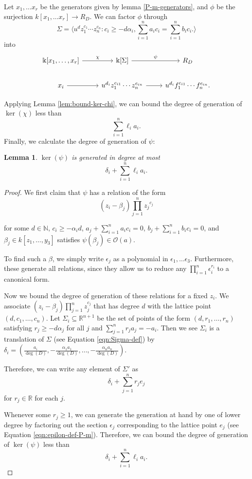 \documentclass{amsart}
\theoremstyle{plain}
\newtheorem{lem}[thm]{Lemma}
\theoremstyle{definition}
\theoremstyle{remark}
\numberwithin{equation}{section}
\newcommand\bk{{\Bbbk}}
\newcommand\bida{a}
\newcommand\bidb{b}
\begin{document}
Let $x_1, \ldots x_r$ be the generators given by lemma  \ref{P-m-generators}, and $\phi$ be the surjection $k[x_1, \ldots x_r] \to R_D$.  We can factor $\phi$ through 
\[
	\Sigma =  \langle u^d z_1^{c_1} \cdots z_n^{c_n} : c_i \geq -d \alpha_i, \sum_{i=1}^{n} \bida_i c_i = \sum_{i=1}^{n} \bidb_i c_i. \rangle 
\]
into
\[
\begin{tikzcd}
\bk[x_1,\ldots, x_r] \ar {r}{\chi} & \bk[\Sigma] \ar {r}{\psi} & R_D \\
x_i \ar r & u^{d_i}z_1^{c_{i1}} \cdots z_n^{c_{in}} \ar r & u^{d_i}f_1^{c_{i1}} \cdots f_n^{c_{in}}.
\end{tikzcd}
\]

Applying Lemma \ref{lem:bound-ker-chi}, we can bound the degree of generation of $\ker(\chi)$ less than
\[
	\sum_{i=1}^n \ell_i a_i.
\]
Finally, we calculate the degree of generation of $\psi$:

\begin{lem}\label{P-m-relations-psi}
$\ker(\psi)$ is generated in degree at most 
\[
	\delta_i + \sum_{i=1}^n \ell_i a_i.
\]
\end{lem}
\begin{proof}
We first claim that $\psi$ has a relation of the form
\begin{equation}\label{eqn:relations-psi}
	(z_i - \beta_j)\prod_{j=1}^n {z_j}^{c_{j}}
\end{equation}

\noindent
for some $d\in \mathbb{N}$, $c_i \ge -\alpha_i d$, $\bida_j + \sum_{i = 1}
^n \bida_i c_i = 0$, $\bidb_j + \sum_{i=1}^n \bidb_i c_i = 0$, and $\beta_j \in
k[z_1, \ldots, y_3]$ satisfies $\psi(\beta_j)\in \mathscr{O}(\bida)$.

To find such a $\beta$, we simply write $\epsilon_j$ as a 
polynomial in $\epsilon_1, \ldots \epsilon _3$. Furthermore, these
generate all relations, since they allow us to reduce any $\prod_{i =
1}^n \epsilon_i^{r_i}$ to a canonical form. 

Now we bound the degree of generation of these relations for a fixed $z_i$.  We associate $(z_i - \beta_j)\prod_{j=1}^n z_j^{c_j}$ that has degree $d$ with the lattice point $(d, c_1, \ldots, c_n)$.  Let $\Sigma_i \subseteq \mathbb{R}^{n+1}$ be the set of points of the form $(d, r_1, \ldots, r_n)$ satisfying $r_j \ge -d \alpha_j$ for all $j$ and $\sum_{j=1}^n r_j a_j = -a_i$.  Then we see $\Sigma_i$ is a translation of $\Sigma$ (see Equation \ref{eqn:Sigma-def}) by $\delta_i = (\frac{a_i}{\deg(D)}, -\frac{\alpha_1 a_1}{\deg(D)}, \ldots, - \frac{\alpha_n a_n}{\deg(D)})$.

Therefore, we can write any element of $\Sigma'$ as
\[
	\delta_i + \sum_{j=1}^n r_j e_j
\]
for $r_j \in \mathbb{R}$ for each $j$.

Whenever some $r_j \ge 1$, we can generate the generation at hand by one of lower degree by factoring out the section $\epsilon_j$ corresponding to the lattice point $e_j$ (see Equation \ref{eqn:epilon-def-P-m}).  Therefore, we can bound the degree of generation of $\ker(\psi)$ less than
\[
	\delta_i + \sum_{i=1}^n \ell_i a_i.
\]
\end{proof}
\end{document}
